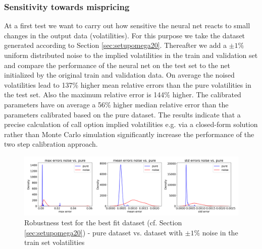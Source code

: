 \documentclass{article}
\begin{document}
\subsubsection{Sensitivity towards mispricing}

At a first test we want to carry out how sensitive the neural net reacts to small changes in the output data (volatilities).  For this purpose we take the dataset generated according to Section \ref{sec:setupomega20}. Thereafter we add a $\pm 1\%$ uniform distributed noise to the implied volatilities in the train and validation set and compare the performance of the neural net on the test set to the net initialized by the original train and validation data. On average the noised volatilities lead to 137\% higher mean relative errors than the pure volatilities in the test set. Also the maximum relative error is 144\% higher. The calibrated parameters have on average a 56\% higher median relative error than the parameters calibrated based on the pure dataset. \newline
The results indicate that a precise calculation of call option implied volatilities e.g. via a closed-form solution rather than Monte Carlo simulation significantly increase the performance of the two step calibration approach.
\begin{figure}[!ht]
\centering
\includegraphics[width=\textwidth]{Robustness_Vola_Noise.png}
\caption{Robustness test for the best fit dataset (cf. Section \ref{sec:setupomega20}) -  pure dataset vs. dataset with $\pm 1\%$ noise in the train set volatilities}
\label{fig:MLE_Price_NN_rel_err_2}
\end{figure}
\end{document}
